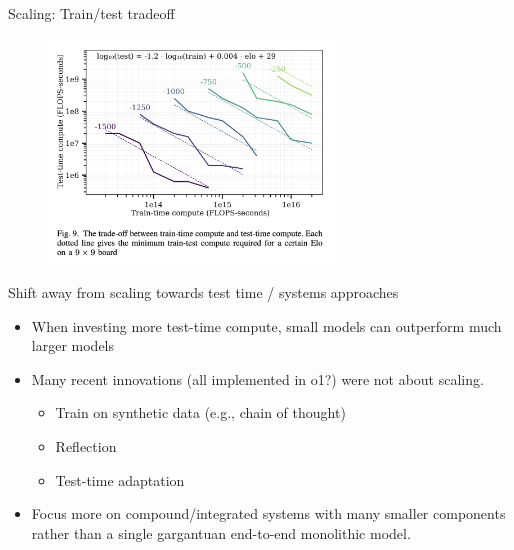 \begin{vbframe}{Scaling: Train/test tradeoff}

\vfill

\begin{figure}
	\centering
	\includegraphics[height = 6cm]{./figure/scalingtraintest.png} \\ 
\end{figure}

                 
\vfill



\end{vbframe}


\begin{vbframe}{Shift away from scaling towards test time /
	systems approaches}

\vfill

\begin{itemize}
	\item When investing more test-time compute, small
	models can outperform much larger models
\item Many recent innovations (all implemented in o1?) were not about scaling.
\begin{itemize}
\item Train on synthetic data (e.g., chain of thought)
\item Reflection
\item Test-time adaptation
\end{itemize}

\item Focus more on compound/integrated systems with many
smaller components rather than a single gargantuan
end-to-end monolithic model.
\end{itemize}

\vfill

\end{vbframe}


